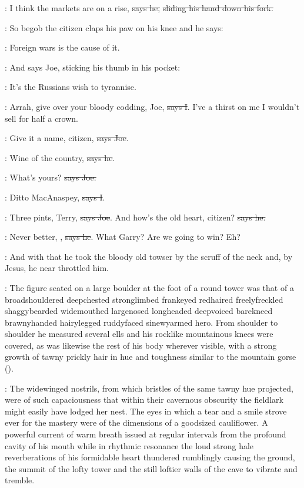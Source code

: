 \joe:
I think the markets are on a rise, \sout{says he,}
\sout{sliding his hand down his fork.}

\Nq:
So begob the citizen claps his paw on his knee and he says:

\citizen:
Foreign wars is the cause of it.

\Nq:
And says Joe, sticking his thumb in his pocket:

\joe:
It's the Russians wish to tyrannise.

:
Arrah, give over your bloody codding, Joe, \sout{says I}.
I've a thirst on me I
wouldn't sell for half a crown.

\joe:
Give it a name, citizen, \sout{says Joe}.

\citizen:
Wine of the country, \sout{says he}.

\joe:
What's yours? \sout{says Joe.}

:
Ditto MacAnaspey, \sout{says I}.

\joe:
Three pints, Terry, \sout{says Joe}.
And how's the old heart, citizen? \sout{says he.}

\citizen:
Never better, , \sout{says he}.
What Garry? Are we going to win? Eh?

\Nq:
And with that he took the bloody old towser by the scruff of the neck
and, by Jesus, he near throttled him.

:
The figure seated on a large boulder at the foot of a round tower
was that of a broadshouldered deepchested stronglimbed frankeyed
redhaired freelyfreckled shaggybearded widemouthed largenosed
longheaded deepvoiced barekneed brawnyhanded hairylegged ruddyfaced
sinewyarmed hero. From shoulder to shoulder he measured several ells and
his rocklike mountainous knees were covered, as was likewise the rest of
his body wherever visible, with a strong growth of tawny prickly hair in
hue and toughness similar to the mountain gorse
().

:
The widewinged nostrils, from which bristles of the same tawny hue projected,
were of such capaciousness that within their cavernous obscurity the
fieldlark might easily have lodged her nest. The eyes in which a tear and
a smile strove ever for the mastery were of the dimensions of a goodsized
cauliflower. A powerful current of warm breath issued at regular intervals
from the profound cavity of his mouth while in rhythmic resonance the
loud strong hale reverberations of his formidable heart thundered
rumblingly causing the ground, the summit of the lofty tower and the still
loftier walls of the cave to vibrate and tremble.

